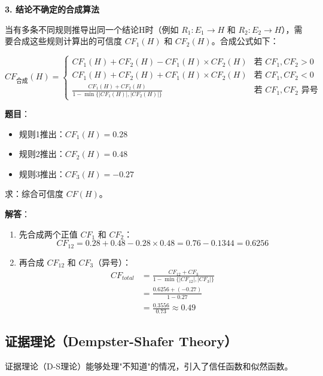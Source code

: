 \textbf{3. 结论不确定的合成算法}

当有多条不同规则推导出同一个结论H时（例如 $R_1: E_1 \to H$ 和 $R_2: E_2 \to H$），需要合成这些规则计算出的可信度 $CF_1(H)$ 和 $CF_2(H)$。合成公式如下：

\begin{equation*}
CF_{合成}(H) = 
\begin{cases}
CF_1(H) + CF_2(H) - CF_1(H) \times CF_2(H) & \text{若 } CF_1, CF_2 > 0 \\
CF_1(H) + CF_2(H) + CF_1(H) \times CF_2(H) & \text{若 } CF_1, CF_2 < 0 \\
\frac{CF_1(H) + CF_2(H)}{1 - \min\{|CF_1(H)|, |CF_2(H)|\}} & \text{若 } CF_1, CF_2 \text{ 异号}
\end{cases}
\end{equation*}

\begin{examplebox}[例题3.20 CF合成计算]
\textbf{题目}：
\begin{itemize}[itemsep=0pt]
    \item 规则1推出：$CF_1(H) = 0.28$
    \item 规则2推出：$CF_2(H) = 0.48$
    \item 规则3推出：$CF_3(H) = -0.27$
\end{itemize}
求：综合可信度 $CF(H)$。

\tcblower
\textbf{解答}：
\begin{enumerate}[itemsep=0pt]
    \item 先合成两个正值 $CF_1$ 和 $CF_2$：
    $$CF_{12} = 0.28 + 0.48 - 0.28 \times 0.48 = 0.76 - 0.1344 = 0.6256$$
    \item 再合成 $CF_{12}$ 和 $CF_3$（异号）：
    \begin{align*}
    CF_{total} &= \frac{CF_{12} + CF_3}{1 - \min\{|CF_{12}|, |CF_3|\}} \\
    &= \frac{0.6256 + (-0.27)}{1 - 0.27} \\
    &= \frac{0.3556}{0.73} \approx 0.49
    \end{align*}
\end{enumerate}
\end{examplebox}

\subsection{证据理论（Dempster-Shafer Theory）}

证据理论（D-S理论）能够处理"不知道"的情况，引入了信任函数和似然函数。

